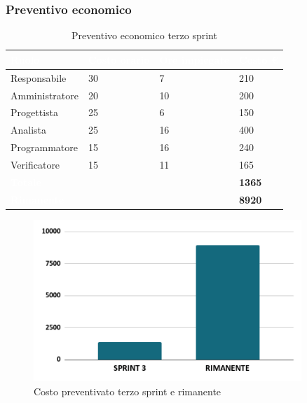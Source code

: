 \subsubsection{Preventivo economico}
{
\setlength{\tabcolsep}{10pt}
\renewcommand{\arraystretch}{1.5}
\begin{table}[h]
    \centering
    \begin{tabularx}{\textwidth}{| l | l | l | X |}
        \hline
        \rowcolor{headerrow} \textbf{\textcolor{white}{Ruolo}} & \textbf{\textcolor{white}{Costo orario}} & \textbf{\textcolor{white}{Ore impiegate}} & \textbf{\textcolor{white}{Costo €}} \\
        \hline
        Responsabile & 30 & 7 & 210\\
        \hline
        Amministratore & 20 & 10 & 200\\
        \hline
        Progettista& 25 & 6 & 150\\
        \hline
        Analista & 25 & 16 & 400\\
        \hline
        Programmatore & 15 & 16 & 240\\
        \hline
        Verificatore & 15 & 11 & 165\\
        \hline
        \cellcolor{headerrow} \textbf{\textcolor{white}{Totale}} &  &  & \textbf{1365}\\
        \hline
        \cellcolor{headerrow} \textbf{\textcolor{white}{Rimanente}} &  &  & \textbf{8920}\\
        \hline
    \end{tabularx}
    \caption{Preventivo economico terzo sprint}
    \label{tab:preventivocostiterzosprint}
\end{table}
}

\begin{figure}[h!]
    \centering
    \includegraphics[width=0.9\textwidth]{prev3costo.png}
    \caption{Costo preventivato terzo sprint e rimanente}
    \label{fig:preventivocostoterzosprint}
\end{figure}

